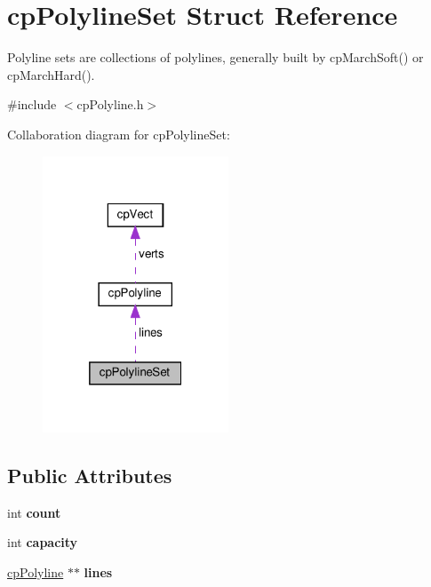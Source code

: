 \hypertarget{structcpPolylineSet}{}\section{cp\+Polyline\+Set Struct Reference}
\label{structcpPolylineSet}


Polyline sets are collections of polylines, generally built by cp\+March\+Soft() or cp\+March\+Hard().  




{\ttfamily \#include $<$cp\+Polyline.\+h$>$}



Collaboration diagram for cp\+Polyline\+Set\+:
\nopagebreak
\begin{figure}[H]
\begin{center}
\leavevmode
\includegraphics[width=157pt]{structcpPolylineSet__coll__graph}
\end{center}
\end{figure}
\subsection*{Public Attributes}
\begin{DoxyCompactItemize}
\item 
\mbox{\label{structcpPolylineSet_aaa93d37daed5b7f89f35319521fd1a7f}} 
int {\bfseries count}
\item 
\mbox{\label{structcpPolylineSet_a0e2a913e1b6a8ead8529157fb7674cac}} 
int {\bfseries capacity}
\item 
\mbox{\label{structcpPolylineSet_a5823de1f717338db286f599316de9665}} 
\hyperlink{structcpPolyline}{cp\+Polyline} $\ast$$\ast$ {\bfseries lines}
\end{DoxyCompactItemize}


